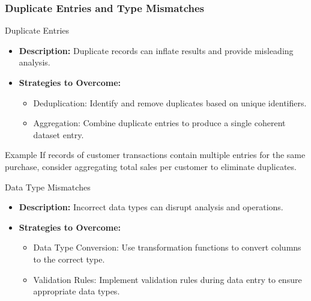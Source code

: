\documentclass[aspectratio=169]{beamer}
\begin{document}
\begin{frame}[fragile]
    \frametitle{Duplicate Entries and Type Mismatches}
    \begin{block}{Duplicate Entries}
        \begin{itemize}
            \item \textbf{Description:} Duplicate records can inflate results and provide misleading analysis.
            \item \textbf{Strategies to Overcome:}
                \begin{itemize}
                    \item Deduplication: Identify and remove duplicates based on unique identifiers.
                    \item Aggregation: Combine duplicate entries to produce a single coherent dataset entry.
                \end{itemize}
        \end{itemize}
        \begin{block}{Example}
            If records of customer transactions contain multiple entries for the same purchase, consider aggregating total sales per customer to eliminate duplicates.
        \end{block}
    \end{block}

    \begin{block}{Data Type Mismatches}
        \begin{itemize}
            \item \textbf{Description:} Incorrect data types can disrupt analysis and operations.
            \item \textbf{Strategies to Overcome:}
                \begin{itemize}
                    \item Data Type Conversion: Use transformation functions to convert columns to the correct type.
                    \item Validation Rules: Implement validation rules during data entry to ensure appropriate data types.
                \end{itemize}
        \end{itemize}
    \end{block}
\end{frame}
\end{document}
